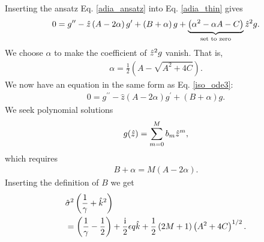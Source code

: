 Inserting the ansatz Eq. \ref{adia_ansatz} into Eq. \ref{adia_thin}
gives
\begin{align}
  0 = g^{\prime\prime} - \hat{z}\left(A - 2\alpha\right)g^\prime + \left(B +
      \alpha\right)g
    +\underbrace{\left(\alpha^2 - \alpha A - C\right)}_\text{set to zero}\hat{z}^2 g.
\end{align}
We choose $\alpha$ to make the coefficient of $\hat{z}^2g$ vanish. That
is,
\begin{align}
  \alpha = \frac{1}{2}\left(A - \sqrt{A^2 + 4C}\right).
\end{align} 
We now have an equation in the same form as Eq. \ref{iso_ode3}:
\begin{align}
  0 = g^{\prime\prime} - \hat{z}\left(A - 2\alpha\right)g^\prime +
  \left(B + \alpha\right)g.
\end{align}
We seek polynomial solutions 
\begin{align}
  g(\hat{z}) = \sum_{m=0}^M b_m \hat{z}^m,
\end{align}
which requires
\begin{align}
  B + \alpha = M\left(A-2\alpha\right).
\end{align}
Inserting the definition of $B$ we get
\begin{align}
  &\hat{\sigma}^2\left(\frac{1}{\gamma}+\hat{k}^2\right) \notag\\ &=
  \left(\frac{1}{\gamma}-\frac{1}{2}\right) +\frac{\mathrm{i}}{2}\epsilon q
  \hat{k} + \frac{1}{2}\left(2M+1\right)\left(A^2 + 4C\right)^{1/2}\label{adia_disp}. 
\end{align}


